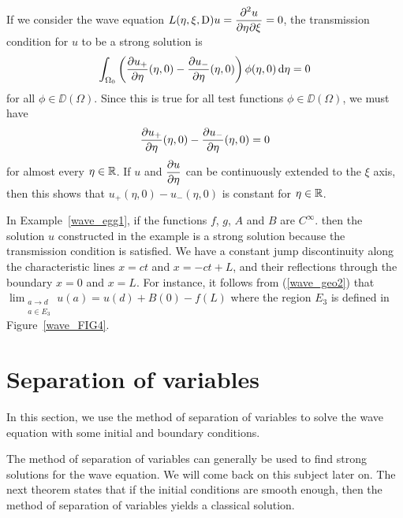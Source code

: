 If we consider the wave equation
$\displaystyle L(\eta,\xi,\diff)u = \pdydxnm{u}{\eta}{\xi}{2}{}{} = 0$, the
transmission condition for $u$ to be a strong solution is
\begin{equation} \label{wave_egg4}
\int_{\Omega_0} \left( \pdydx{u_+}{\eta}(\eta,0)
- \pdydx{u_-}{\eta}(\eta,0)\right) \phi(\eta,0) \dx{\eta} = 0
\end{equation}
for all $\displaystyle \phi\in \DD(\Omega)$.
Since this is true for all test functions $\phi \in \DD(\Omega)$, we must
have
\[
\pdydx{u_+}{\eta}(\eta,0) - \pdydx{u_-}{\eta}(\eta,0) = 0
\]
for almost every $\eta \in \RR$.  If $u$ and $\displaystyle
\pdydx{u}{\eta}$ can be continuously extended to the $\xi$ axis, then
this shows that $\displaystyle u_+(\eta,0) - u_-(\eta,0)$ is constant
for $\eta \in \RR$.

\begin{egg}
In Example~\ref{wave_egg1}, if the functions $f$, $g$, $A$ and $B$ are
$\displaystyle C^\infty$. then the solution $u$ constructed in the example is a
strong solution because the transmission condition is satisfied.
We have a constant jump discontinuity along the characteristic 
lines $x = ct$ and $x = -ct +L$, and their reflections through the
boundary $x=0$ and $x=L$.  For instance, it follows from
(\ref{wave_geo2}) that 
$\displaystyle \lim_{\substack{a \to d\\ a \in E_3}} u(a) = u(d)+ B(0) - f(L)$
where the region $E_3$ is defined in Figure~\ref{wave_FIG4}.
\end{egg}

\section{Separation of variables}

In this section, we use the method of separation of variables to solve
the wave equation with some initial and boundary conditions.

The method of separation of variables can generally be used to find
strong solutions for the wave equation.  We will come back on this
subject later on.  The next theorem states that if the initial
conditions are smooth enough, then the method of separation of
variables yields a classical solution.

